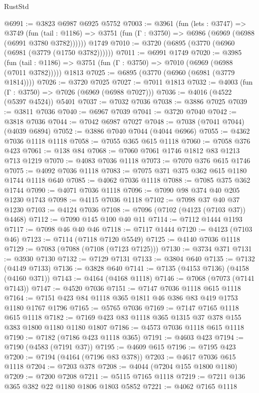 \begin{lexlean}{RustStd}
\begin{coremodule}
@6991 := @3823 @6987 @6925 @5752
@7003 := @3961
    (fun (lets : @3747) =>
    @3749
      (fun (tail : @1186) => @3751 (fun (Γ : @3750) => @6986 (@6969 (@6988 (@6991 @3780 @3782))))))
    @1749
@7010 := @3720 (@6895 (@3770 (@6960 (@6981 (@3779 (@1750 @3782))))))
@7011 := @6991 @1749
@7020 := @3985
    (fun (tail : @1186) => @3751 (fun (Γ : @3750) => @7010 (@6969 (@6988 (@7011 @3782)))))
    @1813
@7025 := @6895 (@3770 (@6960 (@6981 (@3779 @1814))))
@7026 := @3720 @7025
@7027 := @7011 @1813
@7032 := @4003 (fun (Γ : @3750) => @7026 (@6969 (@6988 @7027)))
@7036 := @4016 (@4522 (@5397 @4524)) @5401
@7037 := @7032 @7036
@7038 := @3886 @7025
@7039 := @3811 @7036
@7040 := @6967 @7039
@7041 := @3720 @7040
@7042 := @3818 @7036
@7044 := @7042 @6987 @7027
@7048 := @7038 (@7041 @7044) (@4039 @6894)
@7052 := @3886 @7040 @7044 (@4044 @6966)
@7055 := @4362 @7036 @1118 @1118
@7058 := @7055 @365 @615 @1118
@7060 := @7058 @376 @423
@7061 := @138 @84
@7068 := @7060 @7061 @1746 @1812 @83 @1213 @713 @1219
@7070 := @4083 @7036 @1118
@7073 := @7070 @376 @615 @1746
@7075 := @4092 @7036 @1118
@7083 := @7075 @371 @375 @362 @615 @1180 @1744 @1118 @640
@7085 := @4062 @7036 @1118
@7088 := @7085 @375 @362 @1744
@7090 := @4071 @7036 @1118
@7096 := @7090 @98 @374 @40 @205 @1230 @1743
@7098 := @4115 @7036 @1118
@7102 := @7098 @37 @40 @37 @1230
@7103 := @4124 @7036
@7108 := @7096 (@7102 (@4123 (@7103 @37)) @4468)
@7112 := @7090 @145 @100 @40 @11
@7114 := @7112 @1444 @1193
@7117 := @7098 @46 @40 @46
@7118 := @7117 @1444
@7120 := @4123 (@7103 @46)
@7123 := @7114 (@7118 @7120 @5549)
@7125 := @4140 @7036 @1118
@7129 := @7083 (@7088 (@7108 (@7123 @7125)))
@7130 := @3734 @371
@7131 := @3930 @7130
@7132 := @7129 @7131
@7133 := @3804 @640
@7135 := @7132 (@4149 @7133)
@7136 := @3828 @640
@7141 := @7135 (@4153 @7136) (@4158 (@4160 @371))
@7143 := @4164 (@4168 @1118)
@7146 := @7068 (@7073 (@7141 @7143))
@7147 := @4520 @7036
@7151 := @7147 @7036 @1118 @615 @1118
@7164 := @7151 @423 @84 @1118 @365 @1811 @46 @386 @83 @419 @1753 @1180 @1767 @1796
@7165 := @5765 @7036
@7169 := @7147 @7165 @1118 @615 @1118
@7182 := @7169 @423 @83 @1118 @365 @1315 @37 @378 @155 @383 @1800 @1180 @1180 @1807
@7186 := @4573 @7036 @1118 @615 @1118
@7190 := @7182 (@7186 @423 @1118 @365)
@7191 := @4603 @423
@7194 := @7190 (@4583 (@7191 @37))
@7195 := @4609 @615
@7196 := @7195 @423
@7200 := @7194 (@4164 (@7196 @83 @378))
@7203 := @4617 @7036 @615 @1118
@7204 := @7203 @378
@7208 := @4044 (@7204 @155 @1800 @1180)
@7209 := @7200 @7208
@7211 := @5115 @7165 @1118
@7219 := @7211 @136 @365 @382 @22 @1180 @1806 @1803 @5852
@7221 := @4062 @7165 @1118

\end{coremodule}
\end{lexlean}
